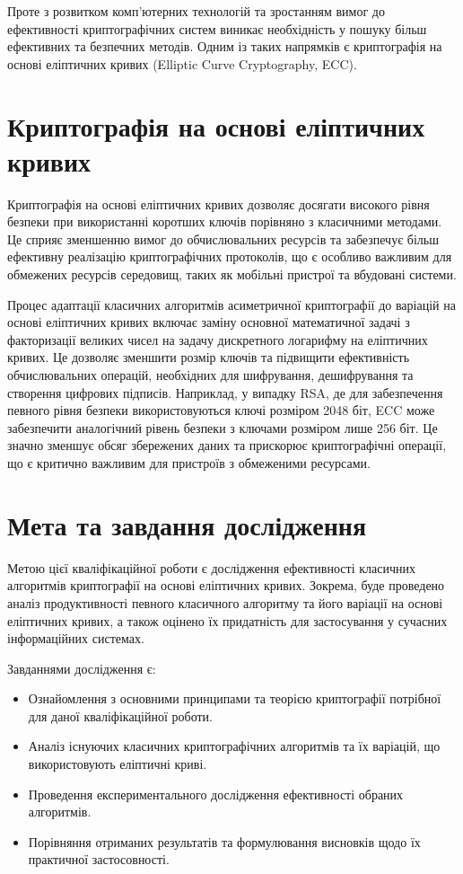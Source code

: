 \documentclass[12pt]{report}
\begin{document}
Проте з розвитком комп’ютерних технологій та зростанням вимог до ефективності криптографічних систем виникає необхідність у пошуку більш ефективних та безпечних методів. Одним із таких напрямків є криптографія на основі еліптичних кривих (Elliptic Curve Cryptography, ECC).

\section{Криптографія на основі еліптичних кривих}

Криптографія на основі еліптичних кривих дозволяє досягати високого рівня безпеки при використанні коротших ключів порівняно з класичними методами. Це сприяє зменшенню вимог до обчислювальних ресурсів та забезпечує більш ефективну реалізацію криптографічних протоколів, що є особливо важливим для обмежених ресурсів середовищ, таких як мобільні пристрої та вбудовані системи. 

Процес адаптації класичних алгоритмів асиметричної криптографії до варіацій на основі еліптичних кривих включає заміну основної математичної задачі з факторизації великих чисел на задачу дискретного логарифму на еліптичних кривих. Це дозволяє зменшити розмір ключів та підвищити ефективність обчислювальних операцій, необхідних для шифрування, дешифрування та створення цифрових підписів. Наприклад, у випадку RSA, де для забезпечення певного рівня безпеки використовуються ключі розміром 2048 біт, ECC може забезпечити аналогічний рівень безпеки з ключами розміром лише 256 біт. Це значно зменшує обсяг збережених даних та прискорює криптографічні операції, що є критично важливим для пристроїв з обмеженими ресурсами.

\section{Мета та завдання дослідження}

Метою цієї кваліфікаційної роботи є дослідження ефективності класичних алгоритмів криптографії на основі еліптичних кривих. Зокрема, буде проведено аналіз продуктивності певного класичного алгоритму та його варіації на основі еліптичних кривих, а також оцінено їх придатність для застосування у сучасних інформаційних системах.

Завданнями дослідження є:

\begin{itemize}
    \item Ознайомлення з основними принципами та теорією криптографії потрібної для даної кваліфікаційної роботи.
    \item Аналіз існуючих класичних криптографічних алгоритмів та їх варіацій, що використовують еліптичні криві.
    \item Проведення експериментального дослідження ефективності обраних алгоритмів.
    \item Порівняння отриманих результатів та формулювання висновків щодо їх практичної застосовності.
\end{itemize}
\end{document}
